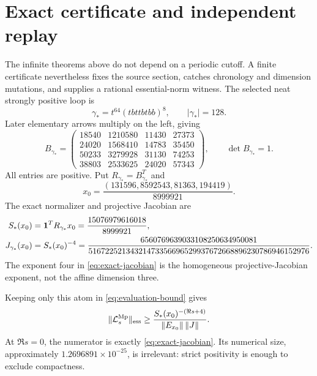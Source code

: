 \section{Exact certificate and independent replay}
\label{sec:certificate}

The infinite theorems above do not depend on a periodic cutoff.  A finite
certificate nevertheless fixes the source section, catches chronology and
dimension mutations, and supplies a rational essential-norm witness.  The
selected neat strongly positive loop is
\begin{equation}
 \gamma_*=t^{64}(tbttbtbb)^8,
 \qquad |\gamma_*|=128.
 \label{eq:gamma-star}
\end{equation}
Later elementary arrows multiply on the left, giving
\begin{equation}
 B_{\gamma_*}=
 \begin{pmatrix}
 18540&1210580&11430&27373\\
 24020&1568410&14783&35450\\
 50233&3279928&31130&74253\\
 38803&2533625&24020&57343
 \end{pmatrix},
 \qquad \det B_{\gamma_*}=1.
 \label{eq:gamma-star-matrix}
\end{equation}
All entries are positive.  Put \(R_{\gamma_*}=B_{\gamma_*}^T\) and
\begin{equation}
 x_0=
 \frac{(131596,8592543,81363,194419)}{8999921}.
 \label{eq:exact-x0}
\end{equation}
The exact normalizer and projective Jacobian are
\begin{align}
 S_*(x_0)
 &=\mathbf{1}^TR_{\gamma_*}x_0
 =\frac{15076979616018}{8999921},
 \label{eq:exact-normalizer}\\
 J_{\gamma_*}(x_0)
 &=S_*(x_0)^{-4}
 =\frac{6560769639033108250634950081}
 {51672252134321473356696529937672668896230786946152976}.
 \label{eq:exact-jacobian}
\end{align}
The exponent four in \eqref{eq:exact-jacobian} is the homogeneous
projective-Jacobian exponent, not the affine dimension three.

Keeping only this atom in \eqref{eq:evaluation-bound} gives
\begin{equation}
 \|\mathcal{L}_s^{\rm Mp}\|_{\mathrm{ess}}
 \geq
 \frac{S_*(x_0)^{-(\Re s+4)}}
 {\|E_{x_0}\|\,\|J\|}.
 \label{eq:exact-essential-floor}
\end{equation}
At \(\Re s=0\), the numerator is exactly
\eqref{eq:exact-jacobian}.  Its numerical size, approximately
\(1.2696891\times10^{-25}\), is irrelevant: strict positivity is enough to
exclude compactness.

